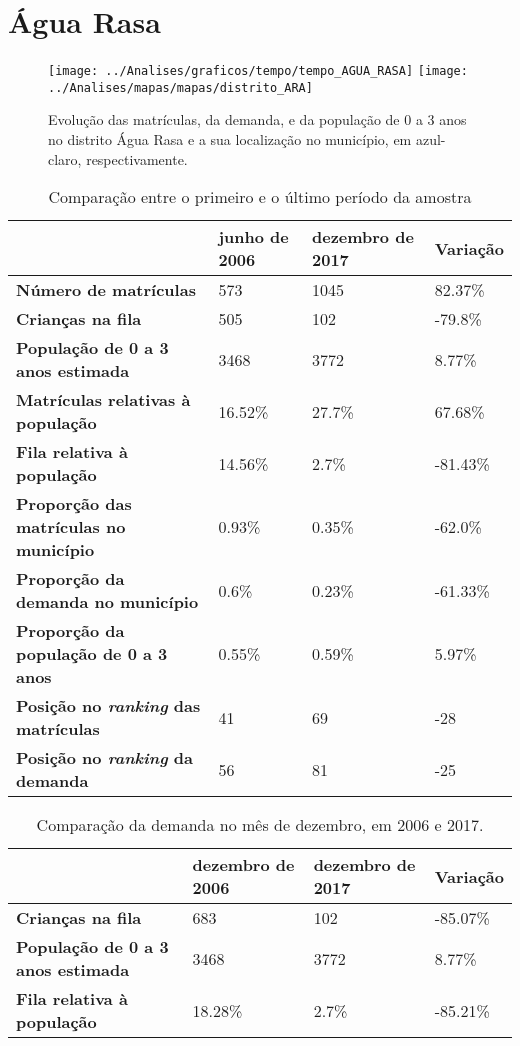\section{Água Rasa}
\begin{figure}[H]
\centering
\texttt{[image: ../Analises/graficos/tempo/tempo\_AGUA\_RASA]}
\texttt{[image: ../Analises/mapas/mapas/distrito\_ARA]}
\caption{Evolução das matrículas, da demanda, e da população de 0 a 3 anos no distrito Água Rasa e a sua localização no município, em azul-claro, respectivamente.}
\end{figure}
\begin{table}[H]
\begin{tabular}{l|l|l|l}
\textbf{}                                      & \textbf{junho de 2006}       & \textbf{dezembro de 2017}    & \textbf{Variação} \\ \hline
\textbf{Número de matrículas}                  & 573 & 1045 & 82.37\% \\ \hline
\textbf{Crianças na fila}                      & 505 & 102 & -79.8\% \\ \hline
\textbf{População de 0 a 3 anos estimada}      & 3468 & 3772 & 8.77\% \\ \hline
\textbf{Matrículas relativas à população}      & 16.52\% & 27.7\% & 67.68\% \\ \hline
\textbf{Fila relativa à população}             & 14.56\% & 2.7\% & -81.43\% \\ \hline
\textbf{Proporção das matrículas no município} & 0.93\% & 0.35\% & -62.0\% \\ \hline
\textbf{Proporção da demanda no município}     & 0.6\% & 0.23\% & -61.33\% \\ \hline
\textbf{Proporção da população de 0 a 3 anos}  & 0.55\% & 0.59\% & 5.97\% \\ \hline
\textbf{Posição no \textit{ranking} das matrículas}     & 41 & 69 & -28 \\ \hline
\textbf{Posição no \textit{ranking} da demanda}         & 56 & 81 & -25 \\ 
\end{tabular}
\caption{Comparação entre o primeiro e o último período da amostra}
\end{table}
\begin{table}[H]
\begin{tabular}{l|l|l|l}
\textbf{}                                 & \textbf{dezembro de 2006} & \textbf{dezembro de 2017} & \textbf{Variação} \\ \hline
\textbf{Crianças na fila}                      & 683 & 102 & -85.07\% \\ \hline
\textbf{População de 0 a 3 anos estimada}      & 3468 & 3772 & 8.77\% \\ \hline
\textbf{Fila relativa à população}             & 18.28\% & 2.7\% & -85.21\% \\
\end{tabular}
\caption{Comparação da demanda no mês de dezembro, em 2006 e 2017.}
\end{table}

